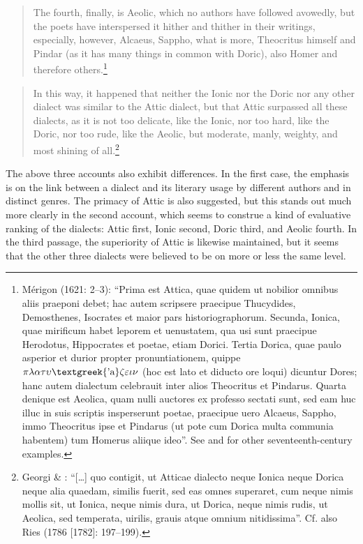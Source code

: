 \documentclass[output=paper]{langsci/langscibook}
\begin{document}
\begin{quote}
The fourth, finally, is Aeolic, which no authors have followed avowedly, but the poets have interspersed it hither and thither in their writings, especially, however, Alcaeus, Sappho, what is more, Theocritus himself and Pindar (as it has many things in common with Doric), also Homer and therefore others.\footnote{Mérigon (1621: 2–3): “Prima est Attica, quae quidem ut nobilior omnibus aliis praeponi debet; hac autem scripsere praecipue Thucydides, Demosthenes, Isocrates et maior pars historiographorum. Secunda, Ionica, quae mirificum habet leporem et uenustatem, qua usi sunt praecipue Herodotus, Hippocrates et poetae, etiam Dorici. Tertia Dorica, quae paulo asperior et durior propter pronuntiationem, quippe $\pi \lambda \alpha \tau \upsilon \text{\textgreek{'a}}\zeta \varepsilon \iota \nu $ (hoc est lato et diducto ore loqui) dicuntur Dores; hanc autem dialectum celebrauit inter alios Theocritus et Pindarus. Quarta denique est Aeolica, quam nulli auctores ex professo sectati sunt, sed eam huc illuc in suis scriptis insperserunt poetae, praecipue uero Alcaeus, Sappho, immo Theocritus ipse et Pindarus (ut pote cum Dorica multa communia habentem) tum Homerus aliique ideo”. See \citet{Hoius1620} and \citet{Rhenius1626} for other seventeenth-century examples.}
\end{quote}

\begin{quote}
In this way, it happened that neither the Ionic nor the Doric nor any other dialect was similar to the Attic dialect, but that Attic surpassed all these dialects, as it is not too delicate, like the Ionic, nor too hard, like the Doric, nor too rude, like the Aeolic, but moderate, manly, weighty, and most shining of all.\footnote{Georgi \& \citet[6]{Graun1729}: “[…] quo contigit, ut Atticae dialecto neque Ionica neque Dorica neque alia quaedam, similis fuerit, sed eas omnes superaret, cum neque nimis mollis sit, ut Ionica, neque nimis dura, ut Dorica, neque nimis rudis, ut Aeolica, sed temperata, uirilis, grauis atque omnium nitidissima”. Cf. also Ries (1786 [1782]: 197–199).}
\end{quote}

The above three accounts also exhibit differences. In the first case, the emphasis is on the link between a dialect and its literary usage by different authors and in distinct genres. The primacy of Attic is also suggested, but this stands out much more clearly in the second account, which seems to construe a kind of evaluative ranking of the dialects: Attic first, Ionic second, Doric third, and Aeolic fourth. In the third passage, the superiority of Attic is likewise maintained, but it seems that the other three dialects were believed to be on more or less the same level.
\end{document}
